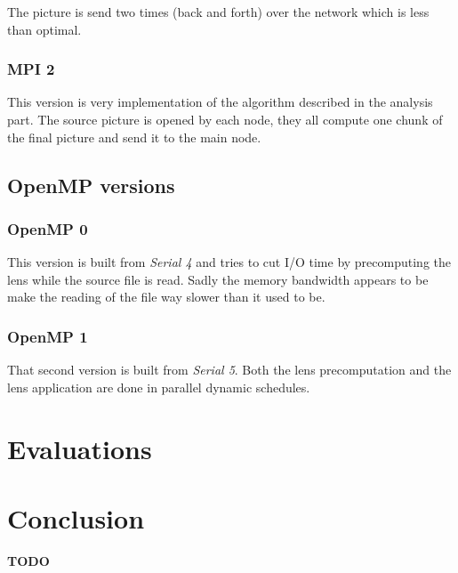 \documentclass[10pt,a4paper]{article}
\begin{document}
The picture is send two times (back and forth) over the network which is less
than optimal.

\subsubsection{MPI 2}

This version is very implementation of the algorithm described in the analysis
part. The source picture is opened by each node, they all compute one chunk of
the final picture and send it to the main node.

\subsection{OpenMP versions}

\subsubsection{OpenMP 0}

This version is built from \emph{Serial 4} and tries to cut I/O time by
precomputing the lens while the source file is read. Sadly the memory bandwidth
appears to be make the reading of the file way slower than it used to be.

\subsubsection{OpenMP 1}

That second version is built from \emph{Serial 5}. Both the lens precomputation
and the lens application are done in parallel dynamic schedules.

\section{Evaluations}

\section{Conclusion}
\textbf{TODO}

%
%
\end{document}
